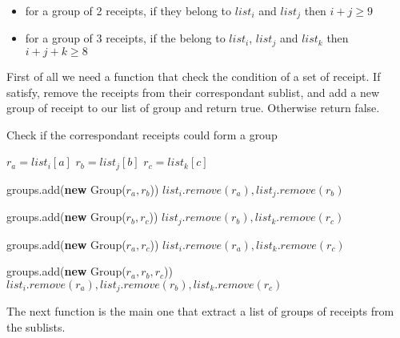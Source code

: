 \begin{itemize}
\item for a group of 2 receipts, if they belong to $list_{i}$ and $list_{j}$ then $i+j \geq 9$
\item for a group of 3 receipts, if the belong to $list_{i}$, $list_{j}$ and $list_{k}$ then $i+j+k \geq 8$
\end{itemize}


First of all we need a function that check the condition of a set of receipt. If satisfy, remove the receipts from their correspondant sublist, and add a new group of receipt to our list of group and return true. Otherwise return false.

\begin{algorithm}[H]
\caption{Check if the correspondant receipts could form a group}
\begin{algorithmic}

\State $r_{a} = list_{i}[a]$
\State $r_{b} = list_{j}[b]$
\State $r_{c} = list_{k}[c]$

	\State groups.add(\textbf{new} Group($r_a, r_b$))
	\State $list_i.remove(r_a), list_j.remove(r_b)$
	\State {}
\EndIf

	\State groups.add(\textbf{new} Group($r_b, r_c$))
	\State $list_j.remove(r_b), list_k.remove(r_c)$
	\State {}
\EndIf

	\State groups.add(\textbf{new} Group($r_a, r_c$))
	\State $list_i.remove(r_a), list_k.remove(r_c)$
	\State {}
\EndIf

	\State groups.add(\textbf{new} Group($r_a, r_b, r_c$))
	\State $list_i.remove(r_a), list_j.remove(r_b), list_k.remove(r_c)$
	\State {}
\EndIf

\EndFunction
\end{algorithmic}
\end{algorithm}

The next function is the main one that extract a list of groups of receipts from the sublists.

